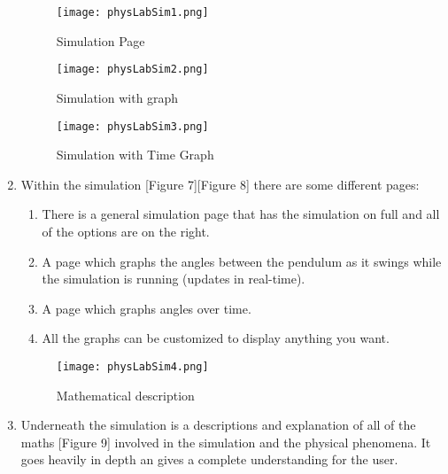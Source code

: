 \documentclass[12pt]{article}
\begin{document}
\begin{enumerate}
\begin{figure}[!htb]
   \begin{minipage}{0.48\textwidth}
     \centering
     \texttt{[image: physLabSim1.png]}
     \caption{Simulation Page}\label{Fig:Figure 6}
   \end{minipage}\hfill
   \begin{minipage}{0.48\textwidth}
     \centering
     \texttt{[image: physLabSim2.png]}
     \caption{Simulation with graph}\label{Fig:Figure 7}
   \end{minipage}
   \begin{minipage}{\textwidth}
     \centering
     \texttt{[image: physLabSim3.png]}
     \caption{Simulation with Time Graph}\label{Fig:Figure 8}
   \end{minipage}\hfill
\end{figure}
    \item Within the simulation [Figure 7][Figure 8] there are some different pages:
        \begin{enumerate}
            \item There is a general simulation page that has the simulation on full and all of the options are on the right.
            \item A page which graphs the angles between the pendulum as it swings while the simulation is running (updates in real-time).
            \item A page which graphs angles over time.
            \item All the graphs can be customized to display anything you want.
        \end{enumerate}
\begin{figure}[!htb]
  \centering
  \texttt{[image: physLabSim4.png]}
  \caption{Mathematical description}\label{Fig:Figure 9}
\end{figure}
    \item Underneath the simulation is a descriptions and explanation of all of the maths [Figure 9] involved in the simulation and the physical phenomena. It goes heavily in depth an gives a complete understanding for the user.
\end{enumerate}
\end{document}
